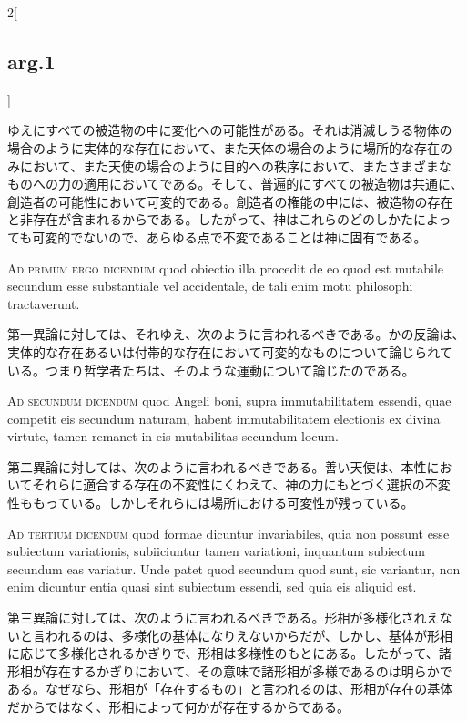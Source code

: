 \documentclass[paper=a4paper,fontsize=10pt,jafontsize=9pt,titlepage]{jlreq}
\begin{document}
\begin{paracol}{2}[\subsection{arg.1}]
\switchcolumn

ゆえにすべての被造物の中に変化への可能性がある。それは消滅しうる物体の
場合のように実体的な存在において、また天体の場合のように場所的な存在の
みにおいて、また天使の場合のように目的への秩序において、またさまざまな
ものへの力の適用においてである。そして、普遍的にすべての被造物は共通に、
創造者の可能性において可変的である。創造者の権能の中には、被造物の存在
と非存在が含まれるからである。したがって、神はこれらのどのしかたによっ
ても可変的でないので、あらゆる点で不変であることは神に固有である。

\switchcolumn*[\subsection{ad.1}]

{\scshape Ad primum ergo dicendum} quod obiectio illa procedit de eo
quod est mutabile secundum esse substantiale vel accidentale, de tali
enim motu philosophi tractaverunt.

\switchcolumn

第一異論に対しては、それゆえ、次のように言われるべきである。かの反論は、
実体的な存在あるいは付帯的な存在において可変的なものについて論じられて
いる。つまり哲学者たちは、そのような運動について論じたのである。

\switchcolumn*[\subsection{ad.2}]

{\scshape Ad secundum dicendum} quod Angeli boni, supra
immutabilitatem essendi, quae competit eis secundum naturam, habent
immutabilitatem electionis ex divina virtute, tamen remanet in eis
mutabilitas secundum locum.

\switchcolumn

第二異論に対しては、次のように言われるべきである。善い天使は、本性にお
いてそれらに適合する存在の不変性にくわえて、神の力にもとづく選択の不変
性ももっている。しかしそれらには場所における可変性が残っている。

\switchcolumn*[\subsection{ad.3}]

{\scshape Ad tertium dicendum} quod formae dicuntur invariabiles, quia
non possunt esse subiectum variationis, subiiciuntur tamen variationi,
inquantum subiectum secundum eas variatur. Unde patet quod secundum quod
sunt, sic variantur, non enim dicuntur entia quasi sint subiectum
essendi, sed quia eis aliquid est.

\switchcolumn

第三異論に対しては、次のように言われるべきである。形相が多様化されえな
いと言われるのは、多様化の基体になりえないからだが、しかし、基体が形相
に応じて多様化されるかぎりで、形相は多様性のもとにある。したがって、諸
形相が存在するかぎりにおいて、その意味で諸形相が多様であるのは明らかで
ある。なぜなら、形相が「存在するもの」と言われるのは、形相が存在の基体
だからではなく、形相によって何かが存在するからである。

\end{paracol}
\end{document}
